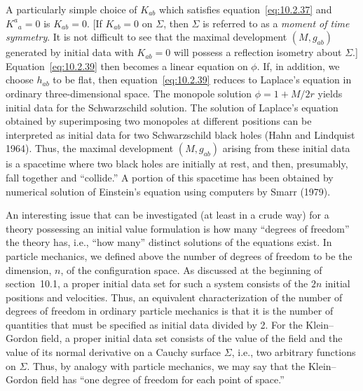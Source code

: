 A particularly simple choice of \(K_{ab}\) which satisfies
equation~\eqref{eq:10.2.37} and \(K^a{}_a=0\) is \(K_{ab}=0\). [If \(K_{ab}=0\) on
\(\Sigma\), then \(\Sigma\) is referred to as a \emph{moment of time symmetry}. It is
not difficult to see that the maximal development \((M,g_{ab})\) generated by initial
data with \(K_{ab}=0\) will possess a reflection isometry about \(\Sigma\).]
Equation~\eqref{eq:10.2.39} then becomes a linear equation on \(\phi\). If, in
addition, we choose \(h_{ab}\) to be flat, then equation~\eqref{eq:10.2.39} reduces to
Laplace's equation in ordinary three-dimensional space. The monopole solution
\(\phi=1+M/2r\) yields initial data for the Schwarzschild solution. The solution of
Laplace's equation obtained by superimposing two monopoles at different positions can
be interpreted as initial data for two Schwarzschild black holes (Hahn and Lindquist
1964). Thus, the maximal development \((M,g_{ab})\) arising from these initial data
is a spacetime where two black holes are initially at rest, and then, presumably, fall
together and ``collide.'' A portion of this spacetime has been obtained by numerical
solution of Einstein's equation using computers by Smarr (1979).

An interesting issue that can be investigated (at least in a crude way) for a theory
possessing an initial value formulation is how many ``degrees of freedom'' the theory
has, i.e., ``how many'' distinct solutions of the equations exist. In particle mechanics,
we defined above the number of degrees of freedom to be the dimension, \(n\), of the
configuration space. As discussed at the beginning of section~10.1, a proper initial
data set for such a system consists of the \(2n\) initial positions and velocities. Thus,
an equivalent characterization of the number of degrees of freedom in ordinary
particle mechanics is that it is the number of quantities that must be specified as initial
data divided by 2. For the Klein--Gordon field, a proper initial data set consists of the
value of the field and the value of its normal derivative on a Cauchy surface \(\Sigma\),
i.e., two arbitrary functions on \(\Sigma\). Thus, by analogy with particle mechanics,
we may say that the Klein--Gordon field has ``one degree of freedom for each point of
space.''

